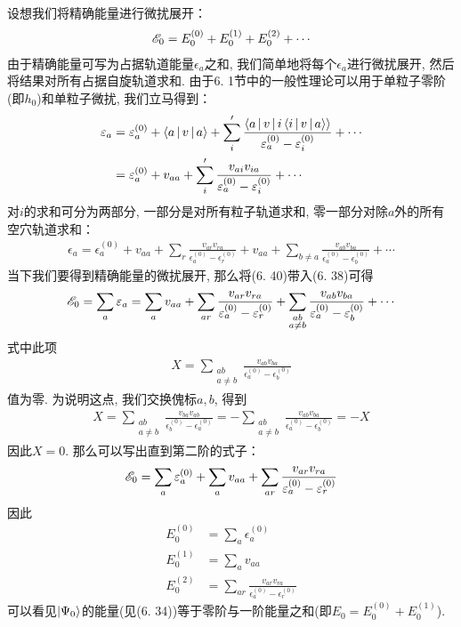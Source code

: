 设想我们将精确能量进行微扰展开：
\begin{align*}
\mathscr{E}_0 = E_0^{(0)} + E_0^{(1)} + E_0^{(2)} + \cdots
\end{align*}
由于精确能量可写为占据轨道能量$\epsilon_a$之和, 
 我们简单地将每个$\epsilon_a$进行微扰展开, 
然后将结果对所有占据自旋轨道求和. 
由于6.
1节中的一般性理论可以用于单粒子零阶\ha (即$h_0$)和单粒子微扰, 
我们立马得到：
\begin{align}
\varepsilon_a & = \varepsilon_a^{(0)} + \Braket{a|v|a} + \sum_i'\frac{\Braket{a|v|i\Braket{i|v|a}}}{\varepsilon_a^{(0)}-\varepsilon_i^{(0)}} + \cdots\notag\\
	       & = \varepsilon_a^{(0)} + v_{aa} + \sum_i'\frac{v_{ai}v_{ia}}{\varepsilon_a^{(0)}-\varepsilon_i^{(0)}} + \cdots
\end{align}
对$i$的求和可分为两部分, 
一部分是对所有粒子轨道求和, 
零一部分对除$a$外的所有空穴轨道求和：
\begin{align}
\epsilon_a = \epsilon_a^{(0)} + v_{aa} + \sum_r\frac{v_{ar}v_{ra}}{\epsilon_a^{(0)}-\epsilon_r^{(0)}} + v_{aa} + \sum_{b\neq a}\frac{v_{ab}v_{ba}}{\epsilon_a^{(0)}-\epsilon_b^{(0)}} + \cdots
\end{align}
当下我们要得到精确能量的微扰展开, 
那么将(6.
40)带入(6.
38)可得
\begin{align}
\mathscr{E}_0 = \sum_a\varepsilon_a = \sum_av_{aa} + \sum_{ar}\frac{v_{ar}v_{ra}}{\varepsilon_a^{(0)} - \varepsilon_{r}^{(0)}} + \sum_{\substack{ab\\a\neq b}}\frac{v_{ab}v_{ba}}{\varepsilon_a^{(0)}- \varepsilon_{b}^{(0)}} + \cdots
\end{align}
式中此项
\begin{align*}
X = \sum_{\substack{ab\\a\neq b}}\frac{v_{ab}v_{ba}}{\epsilon_a^{(0)}- \epsilon_{b}^{(0)}} 
\end{align*}
值为零. 
为说明这点, 
我们交换傀标$a,b$, 
得到
\begin{align*}
X = \sum_{\substack{ab\\a\neq b}}\frac{v_{ba}v_{ab}}{\epsilon_b^{(0)}- \epsilon_{a}^{(0)}}  = - \sum_{\substack{ab\\a\neq b}}\frac{v_{ab}v_{ba}}{\epsilon_a^{(0)}- \epsilon_{b}^{(0)}} = -X 
\end{align*}
因此$X=0$. 
那么可以写出直到第二阶的式子：
\begin{align}
\mathscr{E}_0 = \sum_a\varepsilon_a^{(0)} + \sum_av_{aa} + \sum_{ar}\frac{v_{ar}v_{ra}}{\varepsilon_a^{(0)} - \varepsilon_{r}^{(0)}}
\end{align}
因此
\begin{subequations}
\begin{align}
E_0^{(0)} & = \sum_a\epsilon_a^{(0)}\\
E_0^{(1)} & = \sum_av_{aa} \label{6.43b}\\
E_0^{(2)} & = \sum_{ar}\frac{v_{ar}v_{ra}}{\epsilon_a^{(0)} - \epsilon_r^{(0)}}
\label{6.43c}
\end{align}
\end{subequations}
可以看见$\Ket{\Psi_0}$的能量(见(6.
34))等于零阶与一阶能量之和(即$E_0 = E_0^{(0)}+E_0^{(1)}$).


